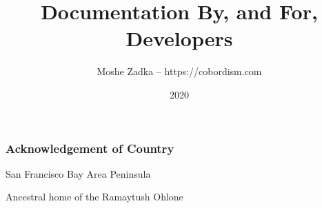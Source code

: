 \usepackage{hyperref}
\usepackage{graphicx}
\usepackage{listings}
\usepackage{textcomp}
\usepackage{fancyvrb}

\title{Documentation By, and For, Developers}
\author{Moshe Zadka -- https://cobordism.com}
\date{2020}


\begin{titlepage}
\maketitle
\end{titlepage}

\frame{\titlepage}

\begin{frame}
\frametitle{Acknowledgement of Country}

San Francisco Bay Area Peninsula

Ancestral home of the Ramaytush Ohlone

\end{frame}


